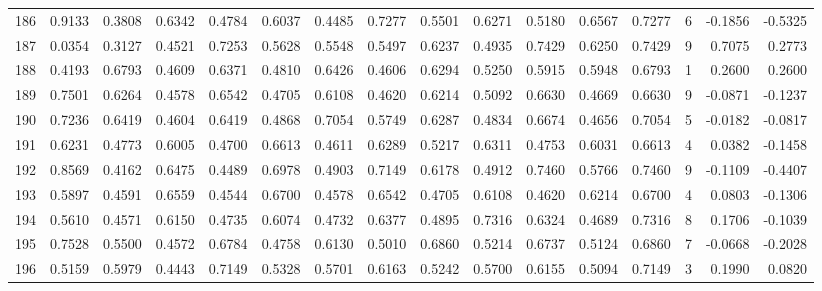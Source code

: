 \begin{tabular}{lrrrrrrrrrrrrrrr}
186 &      0.9133 &  0.3808 &  0.6342 &  0.4784 &  0.6037 &  0.4485 &  0.7277 &  0.5501 &  0.6271 &  0.5180 &   0.6567 &     0.7277 &      6 &                   -0.1856 &                    -0.5325 \\
187 &      0.0354 &  0.3127 &  0.4521 &  0.7253 &  0.5628 &  0.5548 &  0.5497 &  0.6237 &  0.4935 &  0.7429 &   0.6250 &     0.7429 &      9 &                    0.7075 &                     0.2773 \\
188 &      0.4193 &  0.6793 &  0.4609 &  0.6371 &  0.4810 &  0.6426 &  0.4606 &  0.6294 &  0.5250 &  0.5915 &   0.5948 &     0.6793 &      1 &                    0.2600 &                     0.2600 \\
189 &      0.7501 &  0.6264 &  0.4578 &  0.6542 &  0.4705 &  0.6108 &  0.4620 &  0.6214 &  0.5092 &  0.6630 &   0.4669 &     0.6630 &      9 &                   -0.0871 &                    -0.1237 \\
190 &      0.7236 &  0.6419 &  0.4604 &  0.6419 &  0.4868 &  0.7054 &  0.5749 &  0.6287 &  0.4834 &  0.6674 &   0.4656 &     0.7054 &      5 &                   -0.0182 &                    -0.0817 \\
191 &      0.6231 &  0.4773 &  0.6005 &  0.4700 &  0.6613 &  0.4611 &  0.6289 &  0.5217 &  0.6311 &  0.4753 &   0.6031 &     0.6613 &      4 &                    0.0382 &                    -0.1458 \\
192 &      0.8569 &  0.4162 &  0.6475 &  0.4489 &  0.6978 &  0.4903 &  0.7149 &  0.6178 &  0.4912 &  0.7460 &   0.5766 &     0.7460 &      9 &                   -0.1109 &                    -0.4407 \\
193 &      0.5897 &  0.4591 &  0.6559 &  0.4544 &  0.6700 &  0.4578 &  0.6542 &  0.4705 &  0.6108 &  0.4620 &   0.6214 &     0.6700 &      4 &                    0.0803 &                    -0.1306 \\
194 &      0.5610 &  0.4571 &  0.6150 &  0.4735 &  0.6074 &  0.4732 &  0.6377 &  0.4895 &  0.7316 &  0.6324 &   0.4689 &     0.7316 &      8 &                    0.1706 &                    -0.1039 \\
195 &      0.7528 &  0.5500 &  0.4572 &  0.6784 &  0.4758 &  0.6130 &  0.5010 &  0.6860 &  0.5214 &  0.6737 &   0.5124 &     0.6860 &      7 &                   -0.0668 &                    -0.2028 \\
196 &      0.5159 &  0.5979 &  0.4443 &  0.7149 &  0.5328 &  0.5701 &  0.6163 &  0.5242 &  0.5700 &  0.6155 &   0.5094 &     0.7149 &      3 &                    0.1990 &                     0.0820 \\

\end{tabular}
